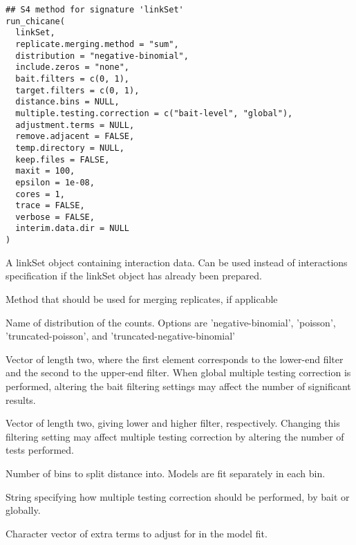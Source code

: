 \documentclass[letterpaper]{book}
\begin{document}
%
\begin{Usage}
\begin{verbatim}
## S4 method for signature 'linkSet'
run_chicane(
  linkSet,
  replicate.merging.method = "sum",
  distribution = "negative-binomial",
  include.zeros = "none",
  bait.filters = c(0, 1),
  target.filters = c(0, 1),
  distance.bins = NULL,
  multiple.testing.correction = c("bait-level", "global"),
  adjustment.terms = NULL,
  remove.adjacent = FALSE,
  temp.directory = NULL,
  keep.files = FALSE,
  maxit = 100,
  epsilon = 1e-08,
  cores = 1,
  trace = FALSE,
  verbose = FALSE,
  interim.data.dir = NULL
)
\end{verbatim}
\end{Usage}
%
\begin{Arguments}
\begin{ldescription}
\item[\code{linkSet}] A linkSet object containing interaction data. Can be used instead of interactions specification if the linkSet object has already been prepared.

\item[\code{replicate.merging.method}] Method that should be used for merging replicates, if applicable

\item[\code{distribution}] Name of distribution of the counts. Options are 'negative-binomial',
'poisson', 'truncated-poisson', and 'truncated-negative-binomial'

\item[\code{bait.filters}] Vector of length two, where the first element corresponds to the lower-end filter and the second to the upper-end filter.
When global multiple testing correction is performed, altering the bait filtering settings may affect the number of significant results.

\item[\code{target.filters}] Vector of length two, giving lower and higher filter, respectively.
Changing this filtering setting may affect multiple testing correction by altering the number of tests performed.

\item[\code{distance.bins}] Number of bins to split distance into. Models are fit separately in each bin.

\item[\code{multiple.testing.correction}] String specifying how multiple testing correction should be performed, by bait or globally.

\item[\code{adjustment.terms}] Character vector of extra terms to adjust for in the model fit.


\end{ldescription}
\end{Arguments}
\end{document}
